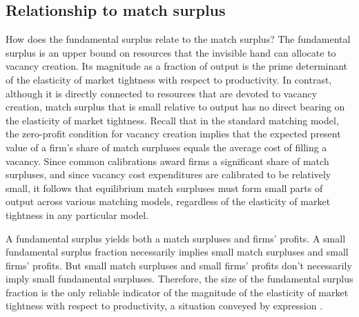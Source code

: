 \subsection{Relationship to match surplus}
How does the fundamental surplus relate to the match surplus?
The fundamental
surplus is an upper bound on resources that the invisible hand
can allocate to vacancy creation.  Its magnitude as a
fraction of output is the prime determinant of the
elasticity of market tightness with respect to productivity.
In contrast, although it
is directly connected to resources that are
devoted to vacancy creation,  match surplus that is small
relative to output
has no direct bearing on the elasticity of market tightness.
Recall that in the standard matching model, the zero-profit
condition for vacancy creation implies that the expected present
value of a firm's share of match surpluses  equals
the average cost of filling a vacancy. Since common
calibrations award firms a significant share of
match surpluses,  and since vacancy cost expenditures are calibrated
to be relatively small,
it follows that
equilibrium match surpluses must form  small parts of output
across various matching models, regardless of the elasticity
of market tightness in any particular model.

A fundamental surplus yields both  a match surpluses and firms' profits.
A small fundamental surplus
fraction necessarily implies small match surpluses and small firms' profits.
But small match surpluses and small firms' profits don't necessarily  imply
small fundamental surpluses. Therefore,   the size of the fundamental surplus fraction
is the only reliable indicator
of  the magnitude
of the elasticity of market tightness with respect to productivity, a situation  conveyed by expression .






